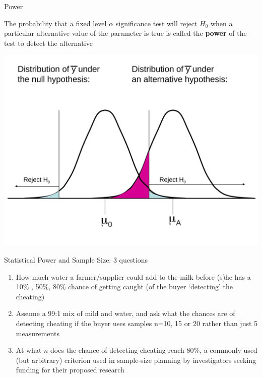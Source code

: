 \documentclass{beamer}\usepackage[]{graphicx}\usepackage[]{color}
\begin{document}
\begin{frame}[fragile]{Power}

\vspace*{-0.2in}

\begin{defm}[Power]
	The probability that a fixed level $\alpha$ significance test will reject $H_0$ when a particular alternative value of the parameter is true is called the \textbf{power} of the test to detect the alternative
\end{defm}


\vspace*{-0.08in}

\centering
\includegraphics[scale=0.35]{HypTest3.pdf}


\end{frame}




\begin{frame}{Statistical Power and Sample Size: 3 questions}

\begin{enumerate}
	\setlength\itemsep{1em}
	\item How much water a farmer/supplier could add to the milk before (s)he has a 10\% , 50\%, 80\%
	chance of getting caught (of the buyer ‘detecting’ the cheating)
	\item Assume a 99:1 mix of mild and water, and ask what the chances are of detecting cheating if the buyer uses samples
	n=10, 15 or 20 rather than just 5 measurements
	\item At what $n$ does the chance of detecting cheating reach 80\%, a commonly used (but arbitrary) criterion used in sample-size planning by investigators seeking funding for their proposed research
\end{enumerate}
\end{frame}
\end{document}
